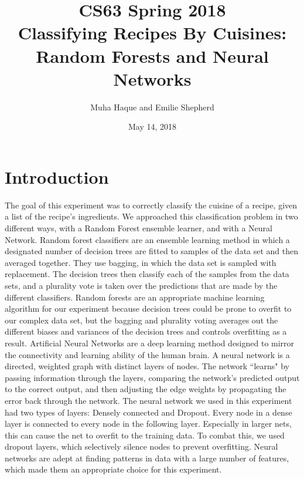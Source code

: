 \documentclass[11pt]{article}
\title{CS63 Spring 2018\\Classifying Recipes By Cuisines:\\ Random Forests and Neural Networks}
\author{Muha Haque and Emilie Shepherd}
\date{May 14, 2018}
\begin{document}
\maketitle

\section{Introduction}


The goal of this experiment was to correctly classify the cuisine of a recipe, given
a list of the recipe's ingredients. We approached this classification problem
in two different ways, with a Random Forest ensemble learner, and with a Neural
Network.
\newline \indent Random forest classifiers are an ensemble learning method in which a designated number of decision trees are fitted to samples of the data set and then
averaged together. They use bagging, in which the data set is sampled with replacement. The decision trees then classify each of the samples from the data sets, and a plurality vote is taken over the predictions that are made by the different classifiers. Random forests are an appropriate machine learning algorithm
for our experiment because decision trees could be prone to overfit to our complex data set, but the bagging and plurality voting averages out the different biases and variances of the decision trees and controls overfitting as a result.
\newline \indent Artificial Neural Networks are a deep learning method designed to mirror the connectivity and learning ability of the human brain.
A neural network is a directed, weighted graph with distinct layers of nodes.
The network ``learns" by passing information through the layers, comparing the network's predicted output to the correct output, and then adjusting the edge weights by
propagating the error back through the network. The neural network we used in this experiment had two types of layers: Densely connected and Dropout.
Every node in a dense layer is connected to every node in the following layer. Especially in larger nets, this can cause the net to overfit to the training data.
To combat this, we used dropout layers, which selectively silence nodes to prevent overfitting. Neural networks are adept at finding patterns in data with a large number of
features, which made them an appropriate choice for this experiment.
\end{document}
